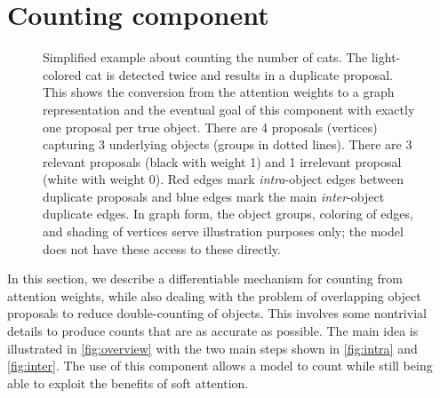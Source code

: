 \documentclass[letterpaper]{article}
\newcommand{\m}[1]{\mathbf{#1}}
\begin{document}
\newcommand{\AO}{\tilde{\m A}}
\newcommand{\T}{\mathsf{T}}

\section{Counting component}\label{sec:counting}

\begin{figure}
    \centering
    \caption{
        Simplified example about counting the number of cats.
        The light-colored cat is detected twice and results in a duplicate proposal.
        This shows the conversion from the attention weights  to a graph representation  and the eventual goal of this component with exactly one proposal per true object.
        There are 4 proposals (vertices) capturing 3 underlying objects (groups in dotted lines).
        There are 3 relevant proposals (black with weight 1) and 1 irrelevant proposal (white with weight 0).
        Red edges mark \emph{intra}-object edges between duplicate proposals and blue edges mark the main \emph{inter}-object duplicate edges.
        In graph form, the object groups, coloring of edges, and shading of vertices serve illustration purposes only; the model does not have these access to these directly.
    }
    \label{fig:overview}
\end{figure}

In this section, we describe a differentiable mechanism for counting from attention weights, while also dealing with the problem of overlapping object proposals to reduce double-counting of objects.
This involves some nontrivial details to produce counts that are as accurate as possible.
The main idea is illustrated in \autoref{fig:overview} with the two main steps shown in \autoref{fig:intra} and \autoref{fig:inter}.
The use of this component allows a model to count while still being able to exploit the benefits of soft attention.
\end{document}
